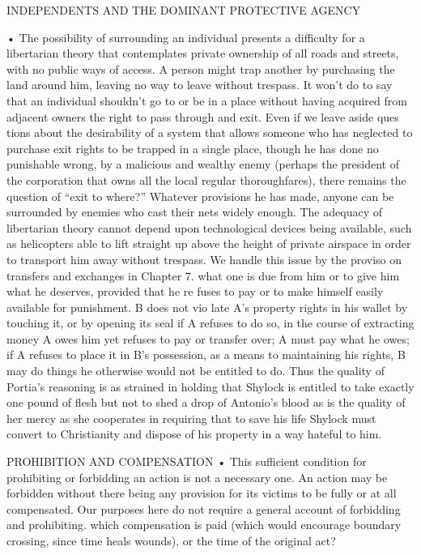 \documentclass[11pt,openany]{book}
\begin{document}
{\footnotesize\setlength{\parindent}{0pt}\setlength{\parskip}{5pt}

INDEPENDENTS AND THE DOMINANT PROTECTIVE AGENCY\par

• The possibility of surrounding an individual presents a difficulty for a libertarian theory that contemplates private ownership of all roads and streets, with no public ways of access. A person might trap another by purchasing the land around him, leaving no way to leave without trespass. It won't do to say that an individual shouldn't go to or be in a place without having acquired from adjacent owners the right to pass through and exit. Even if we leave aside ques tions about the desirability of a system that allows someone who has neglected to purchase exit rights to be trapped in a single place, though he has done no punishable wrong, by a malicious and wealthy enemy (perhaps the president of the corporation that owns all the local regular thoroughfares), there remains the question of ``exit to where?'' Whatever provisions he has made, anyone can be surrounded by enemies who cast their nets widely enough. The adequacy of libertarian theory cannot depend upon technological devices being available, such as helicopters able to lift straight up above the height of private airspace in order to transport him away without trespass. We handle this issue by the proviso on transfers and exchanges in Chapter 7. what one is due from him or to give him what he deserves, provided that he re fuses to pay or to make himself easily available for punishment. B does not vio late A's property rights in his wallet by touching it, or by opening its seal if A refuses to do so, in the course of extracting money A owes him yet refuses to pay or transfer over; A must pay what he owes; if A refuses to place it in B's possession, as a means to maintaining his rights, B may do things he otherwise would not be entitled to do. Thus the quality of Portia's reasoning is as strained in holding that Shylock is entitled to take exactly one pound of flesh but not to shed a drop of Antonio's blood as is the quality of her mercy as she cooperates in requiring that to save his life Shylock must convert to Christianity and dispose of his property in a way hateful to him.\par

PROHIBITION AND COMPENSATION • This sufficient condition for prohibiting or forbidding an action is not a necessary one. An action may be forbidden without there being any provision for its victims to be fully or at all compensated. Our purposes here do not require a general account of forbidding and prohibiting. which compensation is paid (which would encourage boundary crossing, since time heals wounds), or the time of the original act?\par

}
\end{document}
